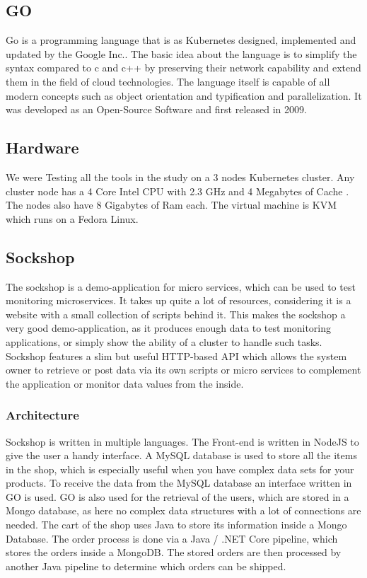 \subsection{GO}
Go is a programming language that is as Kubernetes designed, implemented and updated by the Google Inc.. The basic idea about the language is to simplify the syntax compared to c and c++ by preserving their network capability and extend them in the field of cloud technologies. The language itself is capable of all modern concepts such as object orientation and typification and parallelization. It was developed as an Open-Source Software and first released in 2009.  

\subsection{Hardware}
We were Testing all the tools in the study on a 3 nodes Kubernetes cluster. Any cluster node has a 4 Core Intel CPU with 2.3 GHz and 4 Megabytes of Cache . The nodes also have 8 Gigabytes of Ram  each. The virtual machine is KVM which runs on a Fedora Linux.

\subsection{Sockshop}
The sockshop is a demo-application for micro services, which can be used to test monitoring microservices. It takes up quite a lot of resources, considering it is a website with a small collection of scripts behind it. This makes the sockshop a very good demo-application, as it produces enough data to test monitoring applications, or simply show the ability of a cluster to handle such tasks.
Sockshop features a slim but useful HTTP-based API which allows the system owner to retrieve or post data via its own scripts or micro services to complement the application or monitor data values from the inside.
\subsubsection{Architecture}
Sockshop is written in multiple languages. The Front-end is written in NodeJS to give the user a handy interface. A MySQL database is used to store all the items in the shop, which is especially useful when you have complex data sets for your products. To receive the data from the MySQL database an interface written in GO is used. 
GO is also used for the retrieval of the users, which are stored in a Mongo database, as here no complex data structures with a lot of connections are needed.
The cart of the shop uses Java to store its information inside a Mongo Database. 
The order process is done via a Java / .NET Core pipeline, which stores the orders inside a MongoDB. The stored orders are then processed by another Java pipeline to determine which orders can be shipped.

 


